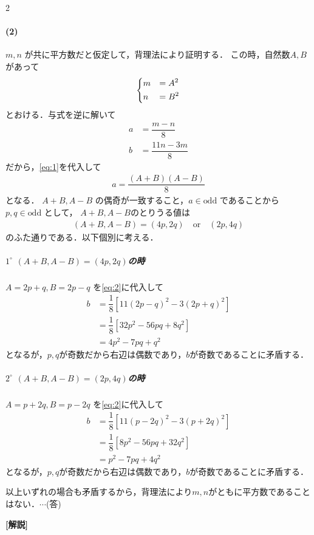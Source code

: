 \documentclass[../../main.tex]{subfiles}
\begin{document}
\begin{multicols}{2}
  \paragraph{(2)}
  $m,n$ が共に平方数だと仮定して，背理法により証明する．
  この時，自然数$A,B$があって
  \begin{align}
    \begin{dcases}
      m & = A^2 \\
      n & = B^2
    \end{dcases} \label{eq:1}
  \end{align}
  とおける．与式を逆に解いて
  \begin{align}
    a & = \dfrac{m-n}{8}                        \\
    b & = \dfrac{11n-3m}{8} \label{eq:2}
  \end{align}
  だから，\cref{eq:1}を代入して
  \begin{align}
    a =\dfrac{(A+B)(A-B)}{8}
  \end{align}
  となる．
  $A+B, A-B$ の偶奇が一致すること，$a \in \text{odd}$ であることから $p,q \in \text{odd}$ として，
  $A+B,A-B$のとりうる値は
  \begin{align}
    (A+B, A-B) = (4p, 2q) \quad \text{or} \quad (2p, 4q)
  \end{align}
  のふた通りである．以下個別に考える．

  \subparagraph{$1^{\circ}$ $(A+B, A-B) = (4p, 2q)$の時}
  $A= 2p+q, B = 2p-q$ を\cref{eq:2}に代入して
  \begin{align}
    b & = \dfrac{1}{8} [11(2p-q)^2 - 3(2p+q)^2] \\
    & = \dfrac{1}{8} [32p^2-56pq + 8q^2]      \\
    & = 4p^2-7pq+q^2
  \end{align}
  となるが，$p,q$が奇数だから右辺は偶数であり，$b$が奇数であることに矛盾する．

  \subparagraph{$2^{\circ}$ $(A+B, A-B) = (2p, 4q)$の時}

  $A= p+2q, B = p-2q$ を\cref{eq:2}に代入して
  \begin{align}
    b & = \dfrac{1}{8} [11(p-2q)^2 - 3(p+2q)^2] \\
    & = \dfrac{1}{8} [8p^2 - 56pq + 32q^2]    \\
    & = p^2-7pq+4q^2
  \end{align}
  となるが，$p,q$が奇数だから右辺は偶数であり，$b$が奇数であることに矛盾する．
  \casesend

  以上いずれの場合も矛盾するから，背理法により$m,n$がともに平方数であることはない．$\cdots$(答)

  {\bf [解説]}

  \newpage
\end{multicols}
\end{document}
